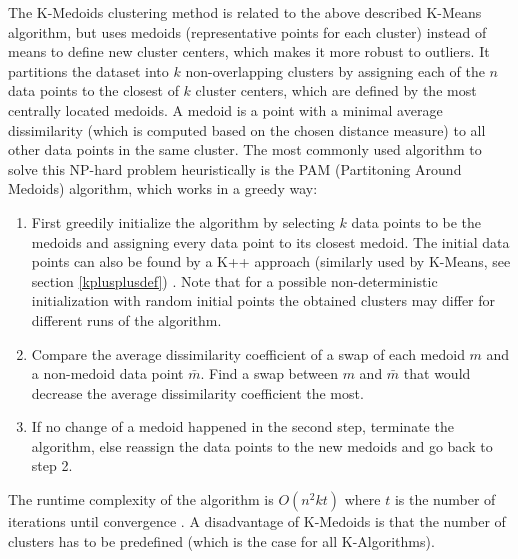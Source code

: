 
The K-Medoids clustering method is related to the above described K-Means algorithm, but uses medoids (representative points for each cluster) instead of means to define new cluster centers, which makes it more robust to outliers\cite{Jin2010}. It partitions the dataset into $k$ non-overlapping clusters by assigning each of the $n$ data points to the closest of $k$ cluster centers, which are defined by the most centrally located medoids. A medoid is a point with a minimal average dissimilarity (which is computed based on the chosen distance measure) to all other data points in the same cluster. The most commonly used algorithm to solve this NP-hard problem heuristically is the PAM (Partitoning Around Medoids) algorithm, which works in a greedy way: \cite{kaufman2009finding} \\
\begin{enumerate}
	\item First greedily initialize the algorithm by selecting $k$ data points to be the medoids and assigning every data point to its closest medoid. The initial data points can also be found by a K++ approach (similarly used by K-Means, see section \ref{kplusplusdef}) \cite{scikit-learn-extra}. Note that for a possible non-deterministic initialization with random initial points the obtained clusters may differ for different runs of the algorithm. \\
	\item Compare the average dissimilarity coefficient of a swap of each medoid $m$ and a non-medoid data point $\bar{m}$. Find a swap between $m$ and $\bar{m}$ that would decrease the average dissimilarity coefficient the most. 
	\item If no change of a medoid happened in the second step, terminate the algorithm, else reassign the data points to the new medoids and go back to step 2. 
\end{enumerate}

The runtime complexity of the algorithm is $O(n^2kt)$ where $t$ is the number of iterations until convergence  \cite{scikit-learn-extra}. A disadvantage of K-Medoids is that the number of clusters has to be predefined (which is the case for all K-Algorithms). 